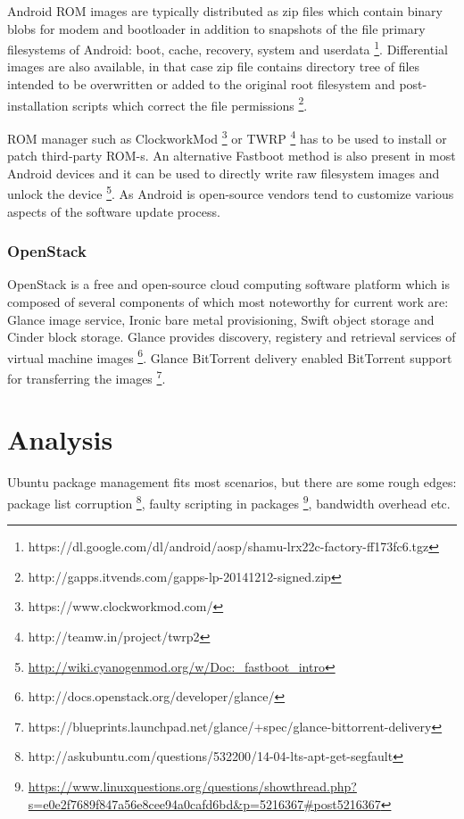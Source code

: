 \documentclass{article}
\begin{document}
Android ROM images are typically distributed as zip files which contain 
binary blobs for modem and bootloader in addition to snapshots of the
file primary filesystems of Android: boot, cache, recovery, system and userdata
\footnote{https://dl.google.com/dl/android/aosp/shamu-lrx22c-factory-ff173fc6.tgz}.
Differential images are also available, in that case zip file contains
directory tree of files intended to be overwritten or added to the original
root filesystem and post-installation scripts which correct the file permissions
\footnote{http://gapps.itvends.com/gapps-lp-20141212-signed.zip}.

ROM manager such as ClockworkMod \footnote{https://www.clockworkmod.com/} or
TWRP \footnote{http://teamw.in/project/twrp2} has to be used to install or patch
third-party ROM-s.
An alternative Fastboot method is also present in most
Android devices and it can be used to directly write raw filesystem images and
unlock the device
\footnote{\url{http://wiki.cyanogenmod.org/w/Doc:_fastboot_intro}}.
As Android is open-source vendors tend to customize various aspects of the
software update process.




\subsection{OpenStack}

OpenStack is a free and open-source cloud computing software platform
which is composed of several components of which most noteworthy for current work are:
Glance image service, Ironic bare metal provisioning,
Swift object storage and Cinder block storage.
Glance provides discovery, registery and retrieval services of virtual machine images
\footnote{http://docs.openstack.org/developer/glance/}.
Glance BitTorrent delivery enabled BitTorrent support for transferring the images
\footnote{https://blueprints.launchpad.net/glance/+spec/glance-bittorrent-delivery}.


\chapter{Analysis}

Ubuntu package management fits most scenarios, but there are some rough edges:
package list corruption
\footnote{http://askubuntu.com/questions/532200/14-04-lts-apt-get-segfault},
faulty scripting in packages
\footnote{\url{https://www.linuxquestions.org/questions/showthread.php?s=e0e2f7689f847a56e8cee94a0cafd6bd&p=5216367#post5216367}},
bandwidth overhead etc.
\end{document}
